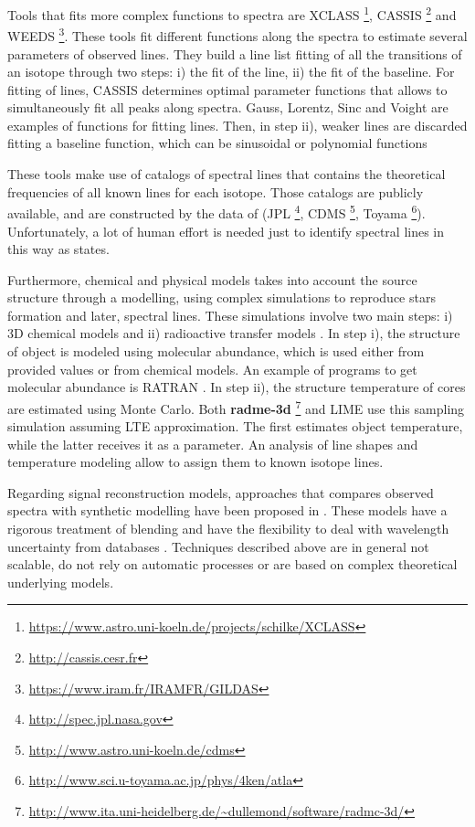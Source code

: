 Tools that fits more complex functions to spectra are 
XCLASS \footnote{\url{https://www.astro.uni-koeln.de/projects/schilke/XCLASS}},
CASSIS \footnote{\url{http://cassis.cesr.fr}} and
WEEDS \footnote{\url{https://www.iram.fr/IRAMFR/GILDAS}}.
These tools fit different functions along the spectra to estimate several parameters of observed lines.
They build a line list fitting of all the transitions of an isotope through two steps:
i) the fit of the line, 
ii) the fit of the baseline.
For fitting of lines, CASSIS determines optimal parameter functions that allows to simultaneously fit all peaks along spectra. Gauss, Lorentz, Sinc and Voight are examples of functions for fitting lines. 
Then, in step ii), weaker lines are discarded fitting a baseline function, which can be sinusoidal or polynomial functions \citep{caux_cassis_2011,vastel_cassis_2015}

These tools make use of catalogs of spectral lines that contains the theoretical frequencies of all known lines for each isotope.
Those catalogs are publicly available, and are constructed by the data of
(JPL \footnote{\url{http://spec.jpl.nasa.gov}},
CDMS \footnote{\url{http://www.astro.uni-koeln.de/cdms}},
Toyama \footnote{\url{http://www.sci.u-toyama.ac.jp/phys/4ken/atla}}).
Unfortunately, a lot of human effort is needed just to identify spectral lines in this way as \citep{schilke_analysis_2011} states.

Furthermore, chemical and physical models takes into account the source structure through a modelling, using complex simulations to reproduce stars formation and later, spectral lines. These simulations involve two main steps:
i) 3D chemical models and 
ii) radioactive transfer models \citep{schilke_analysis_2011}.
In step i), the structure of object is modeled using molecular abundance, which is used either from provided values or from chemical models.
An example of programs to get molecular abundance is RATRAN \citep{hogerheijde_accelerated_2000}.
In step ii), the structure temperature of cores are estimated using Monte Carlo.
Both \textbf{radme-3d} \footnote{\url{http://www.ita.uni-heidelberg.de/~dullemond/software/radmc-3d/}}
and LIME \citep{brinch_lime_2010}
use this sampling simulation assuming LTE approximation.
The first estimates object temperature, while the latter receives it as a parameter.
An analysis of line shapes and temperature modeling allow to assign them to known isotope lines.

Regarding signal reconstruction models, approaches that compares observed spectra with synthetic modelling have been proposed in \citep{pequignot_deep_1996, walsh_deep_2003}.
These models have a rigorous treatment of blending and have the flexibility to deal with wavelength uncertainty from databases \citep{sharpee_introducing_2003}. 
Techniques described above are in general not scalable, do not rely on automatic processes or are based on complex theoretical underlying models. 
